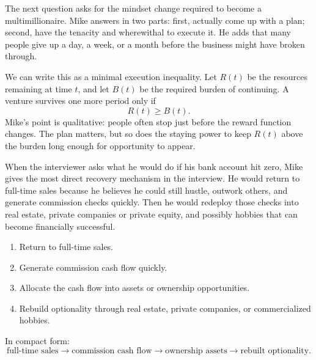 The next question asks for the mindset change required to become a multimillionaire. Mike answers in two parts: first, actually come up with a plan; second, have the tenacity and wherewithal to execute it. He adds that many people give up a day, a week, or a month before the business might have broken through.

We can write this as a minimal execution inequality. Let \(R(t)\) be the resources remaining at time \(t\), and let \(B(t)\) be the required burden of continuing. A venture survives one more period only if
\begin{equation}
R(t) \geq B(t).
\end{equation}
Mike's point is qualitative: people often stop just before the reward function changes. The plan matters, but so does the staying power to keep \(R(t)\) above the burden long enough for opportunity to appear.

When the interviewer asks what he would do if his bank account hit zero, Mike gives the most direct recovery mechanism in the interview. He would return to full-time sales because he believes he could still hustle, outwork others, and generate commission checks quickly. Then he would redeploy those checks into real estate, private companies or private equity, and possibly hobbies that can become financially successful.

\begin{enumerate}
\item Return to full-time sales.
\item Generate commission cash flow quickly.
\item Allocate the cash flow into assets or ownership opportunities.
\item Rebuild optionality through real estate, private companies, or commercialized hobbies.
\end{enumerate}

In compact form:
\begin{equation}
\text{full-time sales}
\longrightarrow
\text{commission cash flow}
\longrightarrow
\text{ownership assets}
\longrightarrow
\text{rebuilt optionality}.
\end{equation}

